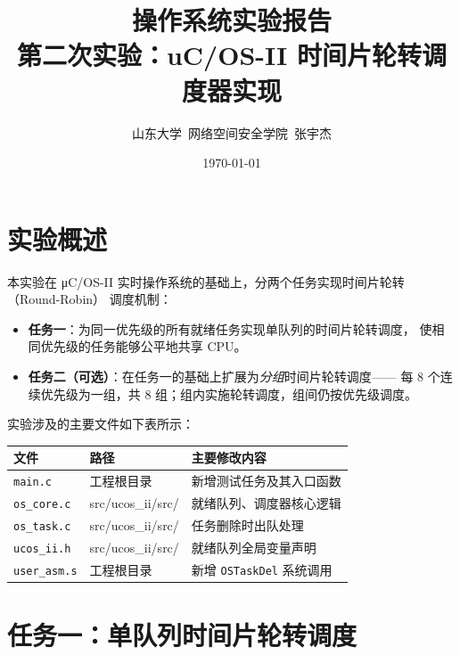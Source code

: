 \documentclass[12pt,a4paper]{article}
\title{%
  \textbf{操作系统实验报告}\\[0.4em]
  \large 第二次实验：uC/OS-II 时间片轮转调度器实现
}
\author{山东大学\ 网络空间安全学院\ 张宇杰}
\date{\today}
\begin{document}
\maketitle
{
\footnotesize 
\tableofcontents
}
\newpage

\section{实验概述}

本实验在 μC/OS-II 实时操作系统的基础上，分两个任务实现时间片轮转（Round-Robin）
调度机制：

\begin{itemize}
  \item \textbf{任务一}：为同一优先级的所有就绪任务实现单队列的时间片轮转调度，
        使相同优先级的任务能够公平地共享 CPU。
  \item \textbf{任务二（可选）}：在任务一的基础上扩展为\emph{分组}时间片轮转调度——
        每 8 个连续优先级为一组，共 8 组；组内实施轮转调度，组间仍按优先级调度。
\end{itemize}

实验涉及的主要文件如下表所示：

\begin{center}
\begin{tabular}{lll}
\toprule
文件 & 路径 & 主要修改内容 \\
\midrule
\texttt{main.c}      & 工程根目录              & 新增测试任务及其入口函数 \\
\texttt{os\_core.c}  & src/ucos\_ii/src/       & 就绪队列、调度器核心逻辑 \\
\texttt{os\_task.c}  & src/ucos\_ii/src/       & 任务删除时出队处理 \\
\texttt{ucos\_ii.h}  & src/ucos\_ii/src/       & 就绪队列全局变量声明 \\
\texttt{user\_asm.s} & 工程根目录              & 新增 \texttt{OSTaskDel} 系统调用 \\
\bottomrule
\end{tabular}
\end{center}

\section{任务一：单队列时间片轮转调度}
\end{document}
